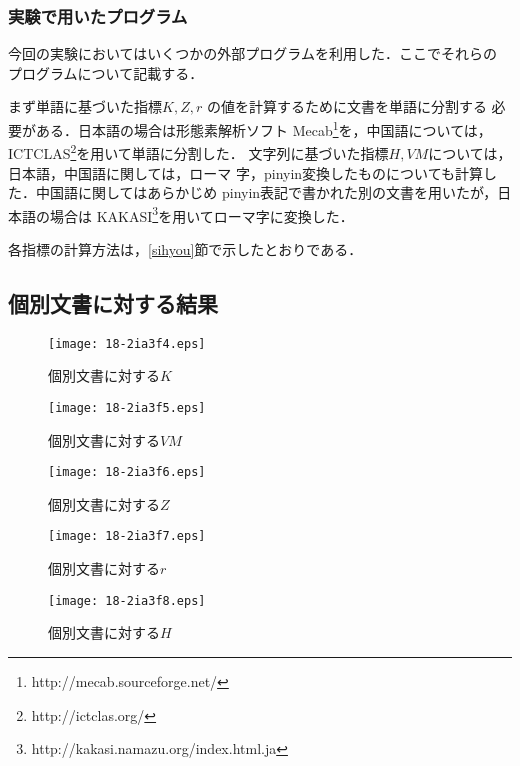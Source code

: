 \documentclass[japanese]{jnlp_JS2.0}
\begin{document}
\subsubsection{実験で用いたプログラム}

今回の実験においてはいくつかの外部プログラムを利用した．ここでそれらの
プログラムについて記載する．

まず単語に基づいた指標$K, Z, r$ の値を計算するために文書を単語に分割する
必要がある．日本語の場合は形態素解析ソフト
Mecab\footnote{http://mecab.sourceforge.net/}を，中国語については，
ICTCLAS\footnote{http://ictclas.org/}を用いて単語に分割した．
文字列に基づいた指標$H, VM$については，日本語，中国語に関しては，ローマ
字，pinyin変換したものについても計算した．中国語に関してはあらかじめ
pinyin表記で書かれた別の文書を用いたが，日本語の場合は
KAKASI\footnote{http://kakasi.namazu.org/index.html.ja}を用いてローマ字に変換した．

各指標の計算方法は，\ref{sihyou}節で示したとおりである．


\subsection{個別文書に対する結果}
\label{result_small}

\begin{figure}[b]
\vspace{-1\baselineskip}
\noindent
\begin{minipage}{0.5\textwidth}
  \begin{center}
   \texttt{[image: 18-2ia3f4.eps]}
  \end{center}
  \caption{個別文書に対する$K$}
  \label{fig:small_k}
 \end{minipage}
 \begin{minipage}{0.5\textwidth}
  \begin{center}
   \texttt{[image: 18-2ia3f5.eps]}
  \end{center}
  \caption{個別文書に対する$\mathit{VM}$}
  \label{fig:small_v}
 \end{minipage}
\end{figure}
\begin{figure}[b]
\noindent
 \begin{minipage}{0.5\textwidth}
  \begin{center}
   \texttt{[image: 18-2ia3f6.eps]}
  \end{center}
  \caption{個別文書に対する$Z$}
  \label{fig:small_z}
 \end{minipage}
 \begin{minipage}{0.5\textwidth}
  \begin{center}
   \texttt{[image: 18-2ia3f7.eps]}
  \end{center}
  \caption{個別文書に対する$r$}
  \label{fig:small_r}
 \end{minipage}
\end{figure}
\begin{figure}[b]
 \begin{center}
  \texttt{[image: 18-2ia3f8.eps]}
 \end{center}
 \caption{個別文書に対する$H$}
 \label{fig:small_h}
\end{figure}
\end{document}
